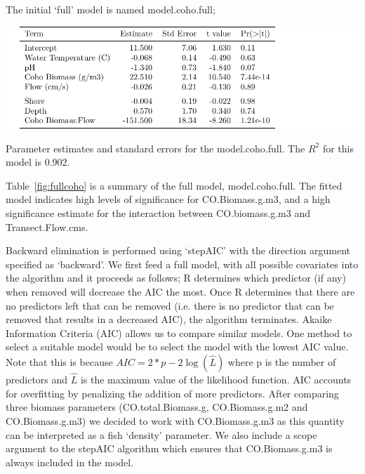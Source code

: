 \vspace{5mm}

The initial `full' model is named model.coho.full;

\vspace{5mm}

\begin{table}[H]
\includegraphics{Chapter5Images/cohofull.pdf}
\caption{Parameter estimates and standard errors for the model.coho.full. The $R^{2}$ for this model is 0.902. }
\label{fig:fullcoho}
\end{table}

Table~\ref{fig:fullcoho} is a summary of the full model, model.coho.full. The fitted model indicates high levels of significance for CO.Biomass.g.m3, and a high significance estimate for the interaction between CO.biomass.g.m3 and Transect.Flow.cms.

\vspace{5mm}

Backward elimination is performed using `stepAIC' \citep{MASS} with the direction argument specified as `backward'. We first feed a full model, with all possible covariates into the algorithm and it proceeds as follows; R determines which predictor (if any) when removed will decrease the AIC the most.  Once R determines that there are no predictors left that can be removed (i.e. there is no predictor that can be removed that results in a decreased AIC), the algorithm terminates. Akaike Information Criteria (AIC) allows us to compare similar models. One method to select a suitable model would be to select the model with the lowest AIC value. Note that this is because $AIC=2*p-2\log(\hat L)$ where p is the number of predictors and $\hat{L}$ is the maximum value of the likelihood function. 
AIC accounts for overfitting by penalizing the addition of more predictors. After comparing three biomass parameters (CO.total.Biomass.g, CO.Biomass.g.m2 and CO.Biomass.g.m3) we decided to work with CO.Biomass.g.m3 as this quantity can be interpreted as a fish `density' parameter. We also include a scope argument to the stepAIC algorithm which ensures that CO.Biomass.g.m3 is always included in the model.




